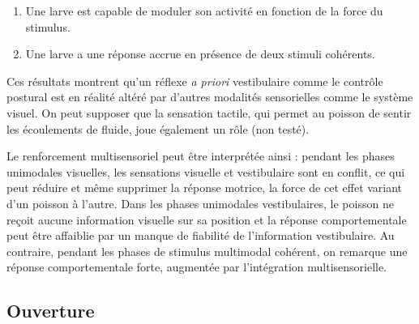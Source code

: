 \begin{enumerate}
    \item Une larve est capable de moduler son activité en fonction de la force du stimulus.
    \item Une larve a une réponse accrue en présence de deux stimuli cohérents.
\end{enumerate}

Ces résultats montrent qu'un réflexe \emph{a priori} vestibulaire comme le contrôle postural est en réalité altéré par d'autres modalités sensorielles comme le système visuel. On peut supposer que la sensation tactile, qui permet au poisson de sentir les écoulements de fluide, joue également un rôle (non testé). 

Le renforcement multisensoriel peut être interprétée ainsi : pendant les phases unimodales visuelles, les sensations visuelle et vestibulaire sont en conflit, ce qui peut réduire et même supprimer la réponse motrice, la force de cet effet variant d'un poisson à l'autre. Dans les phases unimodales vestibulaires, le poisson ne reçoit aucune information visuelle sur sa position et la réponse comportementale peut être affaiblie par un manque de fiabilité de l'information vestibulaire. Au contraire, pendant les phases de stimulus multimodal cohérent, on remarque une réponse comportementale forte, augmentée par l'intégration multisensorielle.


\subsection{Ouverture}


